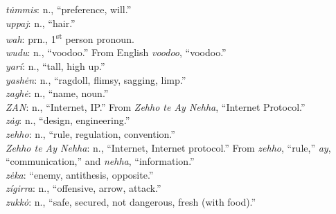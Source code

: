 \documentclass{article}[10pt]
\begin{document}
\begin{multicols}{3}
\emph{t\.{u}mmis}: n., ``preference, will.''\\
\emph{uppaj}: n., ``hair.''\\
\emph{wah}: prn., 1\textsuperscript{st} person pronoun.\\
\emph{wudu}: n., ``voodoo.'' From English \emph{voodoo}, ``voodoo.''\\
\emph{yar\'{i}}: n., ``tall, high up.''\\
\emph{yash\.{e}n}: n., ``ragdoll, flimsy, sagging, limp.''\\
\emph{zagh\.{e}}: n., ``name, noun.''\\
\emph{ZAN}: n., ``Internet, IP.'' From \emph{Zehho te Ay Nehha}, ``Internet Protocol.''\\
\emph{z\.{a}g}: n., ``design, engineering.''\\
\emph{zehho}: n., ``rule, regulation, convention.''\\
\emph{Zehho te Ay Nehha}: n., ``Internet, Internet protocol.'' From \emph{zehho}, ``rule,'' \emph{ay}, ``communication,'' and \emph{nehha}, ``information.''\\
\emph{z\.{e}ka}: ``enemy, antithesis, opposite.''\\
\emph{z\'{i}girra}: n., ``offensive, arrow, attack.''\\
\emph{zukk\.{o}}: n., ``safe, secured, not dangerous, fresh (with food).''\\
\end{multicols}
\end{document}
